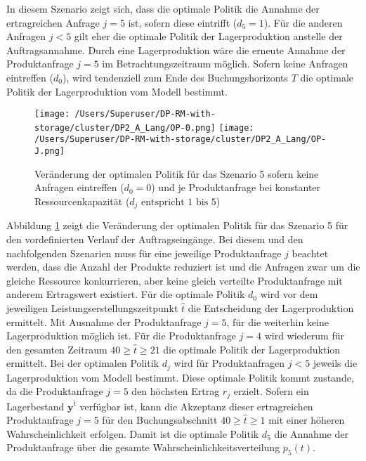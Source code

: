 In diesem Szenario zeigt sich, dass die optimale Politik die Annahme der ertragreichen Anfrage $j=5$ ist, sofern diese eintrifft ($d_5=1$).  Für die anderen Anfragen $j<5$ gilt eher die optimale Politik der Lagerproduktion anstelle der Auftragsannahme. Durch eine Lagerproduktion wäre die erneute Annahme der Produktanfrage $j=5$ im Betrachtungszeitraum möglich. Sofern keine Anfragen eintreffen ($d_0$), wird tendenziell zum Ende des Buchungshorizonts $T$ die optimale Politik der Lagerproduktion vom Modell bestimmt.

\begin{figure}[h!]     
\begin{center}
\texttt{[image: /Users/Superuser/DP-RM-with-storage/cluster/DP2\_A\_Lang/OP-0.png]}
\texttt{[image: /Users/Superuser/DP-RM-with-storage/cluster/DP2\_A\_Lang/OP-J.png]}
    \caption{Veränderung der optimalen Politik für das Szenario 5 sofern keine Anfragen eintreffen ($d_0=0$) und je Produktanfrage bei konstanter Ressourcenkapazität ($d_j\text{ entspricht }1\text{ bis }5$)}  \label{SV5}
  \end{center}
\end{figure}

Abbildung \ref{SV5} zeigt die Veränderung der optimalen Politik für das Szenario 5 für den vordefinierten Verlauf der Auftragseingänge. Bei diesem und den nachfolgenden Szenarien muss für eine jeweilige Produktanfrage $j$ beachtet werden, dass die Anzahl der Produkte reduziert ist und die Anfragen zwar um die gleiche Ressource konkurrieren, aber keine gleich verteilte Produktanfrage mit anderem Ertragswert existiert. Für die optimale Politik $d_0$ wird vor dem jeweiligen Leistungserstellungszeitpunkt $\hat t$ die Entscheidung der Lagerproduktion ermittelt. Mit Ausnahme der Produktanfrage $j=5$, für die weiterhin keine Lagerproduktion möglich ist. Für die Produktanfrage $j=4$ wird wiederum für den gesamten Zeitraum $40\ge\hat t\ge 21$ die optimale Politik der Lagerproduktion ermittelt. Bei der optimalen Politik $d_j$ wird für Produktanfragen $j<5$ jeweils die Lagerproduktion vom Modell bestimmt. Diese optimale Politik kommt zustande, da die Produktanfrage $j=5$ den höchsten Ertrag $r_j$ erzielt. Sofern ein Lagerbestand $\textbf{y}^{\hat t}$ verfügbar ist, kann die Akzeptanz dieser ertragreichen Produktanfrage $j=5$ für den Buchungsabschnitt $40\ge\hat t\ge1$ mit einer höheren Wahrscheinlichkeit erfolgen. Damit ist die optimale Politik $d_5$ die Annahme der Produktanfrage über die gesamte Wahrscheinlichkeitsverteilung $p_5(t)$.

